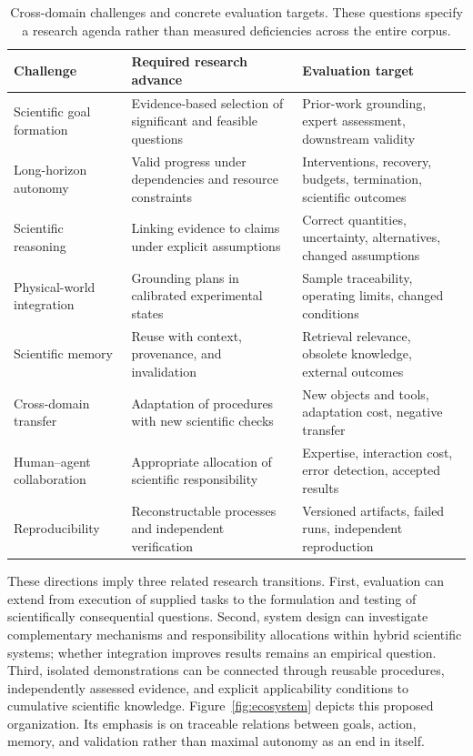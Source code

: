 \begin{table}[H]
\caption{Cross-domain challenges and concrete evaluation targets. These questions specify a research agenda rather than measured deficiencies across the entire corpus.}
\label{tab:future}
\scriptsize
\begin{tabularx}{\textwidth}{@{}p{}XX@{}}
\toprule
Challenge & Required research advance & Evaluation target \\
\midrule
Scientific goal formation & Evidence-based selection of significant and feasible questions & Prior-work grounding, expert assessment, downstream validity \\
Long-horizon autonomy & Valid progress under dependencies and resource constraints & Interventions, recovery, budgets, termination, scientific outcomes \\
Scientific reasoning & Linking evidence to claims under explicit assumptions & Correct quantities, uncertainty, alternatives, changed assumptions \\
Physical-world integration & Grounding plans in calibrated experimental states & Sample traceability, operating limits, changed conditions \\
Scientific memory & Reuse with context, provenance, and invalidation & Retrieval relevance, obsolete knowledge, external outcomes \\
Cross-domain transfer & Adaptation of procedures with new scientific checks & New objects and tools, adaptation cost, negative transfer \\
Human--agent collaboration & Appropriate allocation of scientific responsibility & Expertise, interaction cost, error detection, accepted results \\
Reproducibility & Reconstructable processes and independent verification & Versioned artifacts, failed runs, independent reproduction \\
\bottomrule
\end{tabularx}
\end{table}

These directions imply three related research transitions. First, evaluation can extend from execution of supplied tasks to the formulation and testing of scientifically consequential questions. Second, system design can investigate complementary mechanisms and responsibility allocations within hybrid scientific systems; whether integration improves results remains an empirical question. Third, isolated demonstrations can be connected through reusable procedures, independently assessed evidence, and explicit applicability conditions to cumulative scientific knowledge. Figure~\ref{fig:ecosystem} depicts this proposed organization. Its emphasis is on traceable relations between goals, action, memory, and validation rather than maximal autonomy as an end in itself.

